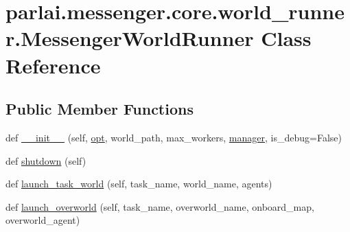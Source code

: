 \hypertarget{classparlai_1_1messenger_1_1core_1_1world__runner_1_1MessengerWorldRunner}{}\section{parlai.\+messenger.\+core.\+world\+\_\+runner.\+Messenger\+World\+Runner Class Reference}
\label{classparlai_1_1messenger_1_1core_1_1world__runner_1_1MessengerWorldRunner}
\subsection*{Public Member Functions}
\begin{DoxyCompactItemize}
\item 
def \hyperlink{classparlai_1_1messenger_1_1core_1_1world__runner_1_1MessengerWorldRunner_a8923a9fe89c2f84c80c968a3d356b1ea}{\+\_\+\+\_\+init\+\_\+\+\_\+} (self, \hyperlink{classparlai_1_1messenger_1_1core_1_1world__runner_1_1MessengerWorldRunner_a5c024dadc50e64dca53b77118b644695}{opt}, world\+\_\+path, max\+\_\+workers, \hyperlink{classparlai_1_1messenger_1_1core_1_1world__runner_1_1MessengerWorldRunner_a8b845c1bfc69c5026752634ab3df84e2}{manager}, is\+\_\+debug=False)
\item 
def \hyperlink{classparlai_1_1messenger_1_1core_1_1world__runner_1_1MessengerWorldRunner_af16885a47e8d5cab2b6bdcc8af55c241}{shutdown} (self)
\item 
def \hyperlink{classparlai_1_1messenger_1_1core_1_1world__runner_1_1MessengerWorldRunner_a4fc3aded0f50104a425b65def4738607}{launch\+\_\+task\+\_\+world} (self, task\+\_\+name, world\+\_\+name, agents)
\item 
def \hyperlink{classparlai_1_1messenger_1_1core_1_1world__runner_1_1MessengerWorldRunner_a9e8caf7821b9d5bd3fedf09ef1a1b027}{launch\+\_\+overworld} (self, task\+\_\+name, overworld\+\_\+name, onboard\+\_\+map, overworld\+\_\+agent)
\end{DoxyCompactItemize}
